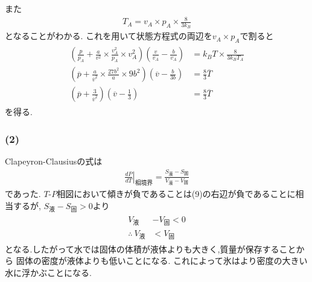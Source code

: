 \documentclass[uplatex,a4j,11pt,dvipdfmx]{jsarticle}
\begin{document}
また
\begin{align}
  T_A=v_A\times p_A\times\frac{8}{3k_B}
\end{align}
となることがわかる.
これを用いて状態方程式の両辺を$v_A\times p_A$で割ると
\begin{align}
  \begin{split}
    \left(\frac{p}{p_A}+\frac{a}{v^2}\times\frac{v_A^2}{p_A}\times v_A^2\right)\left(\frac{v}{v_A}-\frac{b}{v_A}\right)&=k_BT\times\frac{8}{3k_BT_A}\\
    \left(\overline{p}+\frac{a}{\overline{v}^2}\times\frac{27b^2}{a}\times 9b^2\right)\left(\overline{v}-\frac{b}{3b}\right)&=\frac{8}{3}\overline{T}\\
    \left(\overline{p}+\frac{3}{\overline{v}^2}\right)\left(\overline{v}-\frac{1}{3}\right)&=\frac{8}{3}\overline{T}
  \end{split}
\end{align}
を得る.
\subsubsection*{(2)}
Clapeyron-Clausiusの式は
\begin{align}
  \left.\frac{dP}{dT}\right|_{相境界}=\frac{S_{液}-S_{固}}{V_{液}-V_{固}}
\end{align}
であった.
$T$-$P$相図において傾きが負であることは(9)の右辺が負であることに相当するが,
$S_{液}-S_{固}>0$より
\begin{align}
  \begin{split}
    V_{液}&-V_{固}<0\\
    \therefore\ V_{液}&<V_{固}
  \end{split}
\end{align}
となる.したがって水では固体の体積が液体よりも大きく,質量が保存することから
固体の密度が液体よりも低いことになる.
これによって氷はより密度の大きい水に浮かぶことになる.
\end{document}

